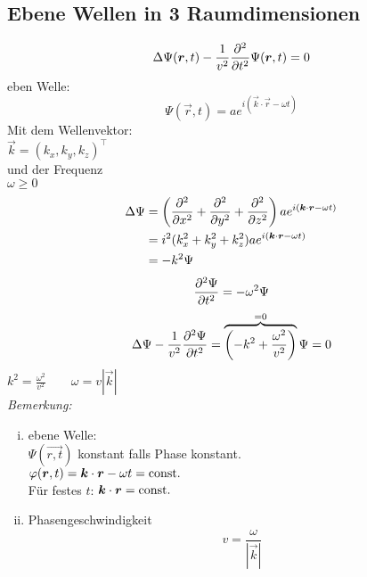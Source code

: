 \subsection{Ebene Wellen in 3 Raumdimensionen}
\begin{equation*}
\Delta \Psi(\bm{r} ,t) - \frac{1}{v^2} \frac{\partial ^2}{\partial t^2} \Psi(\bm{r},t) = 0
\end{equation*}
eben Welle:
\begin{equation*}
\Psi(\vec{r} ,t) = a e^{i (\vec{k} \cdot \vec{r} - \omega t)}
\end{equation*}
Mit dem Wellenvektor:\\
$ \vec{k} = (k_x, k_y, k_z)^\top $\\
und der Frequenz\\
$ \omega \ge 0 $
\begin{align*}
\Delta \Psi &= \left(\frac{\partial ^2}{\partial x^2} + \frac{\partial ^2}{\partial y^2} + \frac{\partial ^2}{\partial z^2}\right) a e^{i(\bm{k} \cdot \bm{r} - \omega t)} \\
&= i^2 (k_x^2 + k_y^2 + k_z^2) a e^{i(\bm{k} \cdot \bm{r} - \omega t)}\\
&= - k^2 \Psi
\end{align*}
\begin{equation*}
\frac{\partial ^2 \Psi}{\partial t^2} = - \omega^2 \Psi
\end{equation*}
\begin{equation*}
\Delta \Psi - \frac{1}{v^2} \frac{\partial ^2 \Psi}{\partial t^2} = \overbrace{\left(- k^2 + \frac{\omega^2}{v^2}\right)}^{=0} \Psi = 0
\end{equation*}
$ k^2 = \frac{\omega^2}{v^2} \qquad \omega = v |\vec{k}| $\\[5pt]
\emph{Bemerkung:}\\
\begin{minipage}{.5\linewidth}
	\begin{enumerate}[i)]
		\item ebene Welle:\\
		$ \Psi(\vec{r,t}) $ konstant falls Phase konstant.\\
		$ \varphi (\bm{r} ,t) = \bm{k} \cdot \bm{r} - \omega t = \textrm{const.} $\\
		Für festes $ t $: $ \bm{k} \cdot \bm{r} = \textrm{const.} $
		\item Phasengeschwindigkeit
		\begin{equation*}
		v = \frac{\omega}{|\vec{k}|}
		\end{equation*}
	\end{enumerate}
\end{minipage}%
